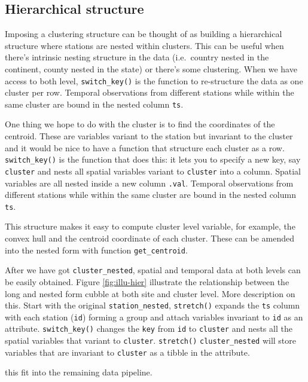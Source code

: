 \documentclass[
]{jss}
\begin{document}
\hypertarget{hierarchical-structure}{%
\subsection{Hierarchical structure}\label{hierarchical-structure}}

Imposing a clustering structure can be thought of as building a
hierarchical structure where stations are nested within clusters. This
can be useful when there's intrinsic nesting structure in the data
(i.e.~country nested in the continent, county nested in the state) or
there's some clustering. When we have access to both level,
\texttt{switch\_key()} is the function to re-structure the data as one
cluster per row. Temporal observations from different stations while
within the same cluster are bound in the nested column \texttt{ts}.

One thing we hope to do with the cluster is to find the coordinates of
the centroid. These are variables variant to the station but invariant
to the cluster and it would be nice to have a function that structure
each cluster as a row. \texttt{switch\_key()} is the function that does
this: it lets you to specify a new key, say \texttt{cluster} and nests
all spatial variables variant to \texttt{cluster} into a column. Spatial
variables are all nested inside a new column \texttt{.val}. Temporal
observations from different stations while within the same cluster are
bound in the nested column \texttt{ts}.

This structure makes it easy to compute cluster level variable, for
example, the convex hull and the centroid coordinate of each cluster.
These can be amended into the nested form with function
\texttt{get\_centroid}.

After we have got \texttt{cluster\_nested}, spatial and temporal data at
both levels can be easily obtained. Figure \ref{fig:illu-hier}
illustrate the relationship between the long and nested form cubble at
both site and cluster level. More description on this. Start with the
original \texttt{station\_nested}, \texttt{stretch()} expands the
\texttt{ts} column with each station (\texttt{id}) forming a group and
attach variables invariant to \texttt{id} as an attribute.
\texttt{switch\_key()} changes the \texttt{key} from \texttt{id} to
\texttt{cluster} and nests all the spatial variables that variant to
\texttt{cluster}. \texttt{stretch()} \texttt{cluster\_nested} will store
variables that are invariant to \texttt{cluster} as a tibble in the
attribute.

this fit into the remaining data pipeline.
\end{document}
